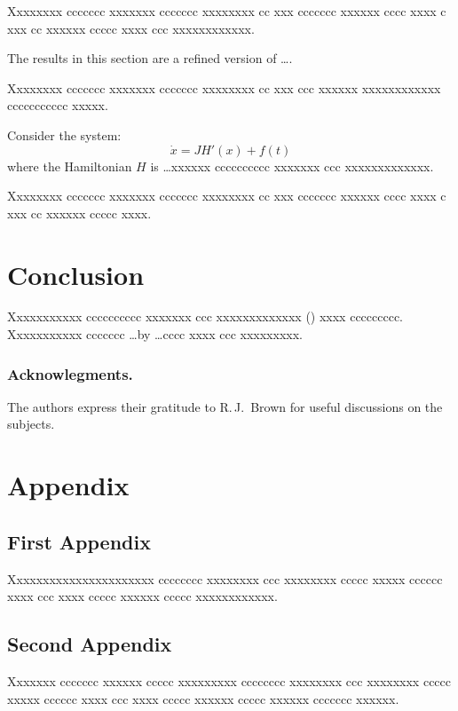 \documentclass[citeauthoryear]{GTM2020}
\begin{document}
Xxxxxxxx ccccccc xxxxxxx ccccccc xxxxxxxx cc xxx ccccccc xxxxxx
cccc xxxx c xxx cc xxxxxx ccccc xxxx ccc xxxxxxxxxxxx.

\begin{remark}
The results in this section are a refined version of \dots .
\end{remark}

Xxxxxxxx ccccccc xxxxxxx ccccccc xxxxxxxx cc xxx ccc xxxxxx
xxxxxxxxxxxx ccccccccccc xxxxx.

\begin{example}
Consider the system:
\begin{equation}
  \dot{x} = JH' (x) + f(t)
\end{equation}
where the Hamiltonian $H$ is \dots xxxxxx cccccccccc
xxxxxxx ccc xxxxxxxxxxxxx.
\end{example}

Xxxxxxxx ccccccc xxxxxxx ccccccc xxxxxxxx cc xxx ccccccc xxxxxx
cccc xxxx c xxx cc xxxxxx ccccc xxxx.


\section{Conclusion}

Xxxxxxxxxxx cccccccccc xxxxxxx ccc xxxxxxxxxxxxx
(\cite{clar}) xxxx ccccccccc. Xxxxxxxxxxx ccccccc
\dots by \cite{Sub} \dots cccc xxxx ccc xxxxxxxxx.

\subsubsection{Acknowlegments.}
The authors express their gratitude to R.\,J.\ Brown for
useful discussions on the subjects.

\section*{Appendix}
\begin{appendix}
\subsection{First Appendix}

Xxxxxxxxxxxxxxxxxxxxxx cccccccc xxxxxxxx ccc xxxxxxxx ccccc xxxxx
cccccc xxxx ccc xxxx ccccc xxxxxx ccccc xxxxxxxxxxxx.

\subsection{Second Appendix}

Xxxxxxx ccccccc xxxxxx ccccc xxxxxxxxx cccccccc xxxxxxxx ccc
xxxxxxxx ccccc xxxxx cccccc xxxx ccc xxxx ccccc xxxxxx ccccc xxxxxx
ccccccc xxxxxx.
\end{appendix}
\end{document}
